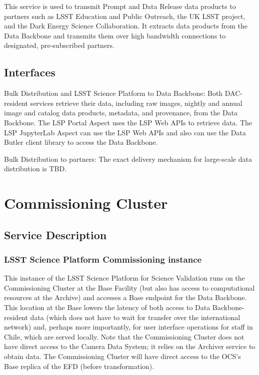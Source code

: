 \documentclass[DM,toc,lsstdraft]{lsstdoc}
\begin{document}
This service is used to transmit Prompt and Data Release data products to partners such as LSST Education and Public Outreach, the UK LSST project, and the Dark Energy Science Collaboration.
It extracts data products from the Data Backbone and transmits them over high bandwidth connections to designated, pre-subscribed partners.


\subsection{Interfaces}\label{dac-interfaces}

Bulk Distribution and LSST Science Platform to Data Backbone: Both
DAC-resident services retrieve their data, including raw images, nightly and
annual image and catalog data products, metadata, and provenance, from the Data
Backbone.  The LSP Portal Aspect uses the LSP Web APIs to retrieve data.  The
LSP JupyterLab Aspect can use the LSP Web APIs and also can use the Data Butler
client library to access the Data Backbone.

Bulk Distribution to partners: The exact delivery mechanism for
large-scale data distribution is TBD.


\section{Commissioning Cluster}\label{commissioning-cluster}

\subsection{Service Description}\label{commcluster-service}

\subsubsection{LSST Science Platform Commissioning
instance}\label{lsst-science-platform-commissioning-instance}

This instance of the LSST Science Platform for Science Validation runs
on the Commissioning Cluster at the Base Facility (but also has access
to computational resources at the Archive) and accesses a Base endpoint
for the Data Backbone. This location at the Base lowers the latency of
both access to Data Backbone-resident data (which does not have to wait
for transfer over the international network) and, perhaps more
importantly, for user interface operations for staff in Chile, which are
served locally. Note that the Commissioning Cluster does not have direct
access to the Camera Data System; it relies on the Archiver service to
obtain data. The Commissioning Cluster will have direct access to the
OCS's Base replica of the EFD (before transformation).
\end{document}
